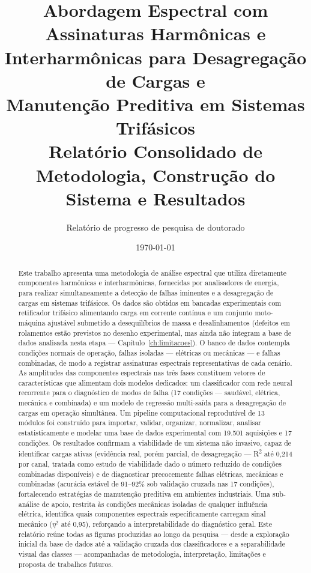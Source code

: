 \documentclass[12pt,a4paper]{report}
\title{\textbf{Abordagem Espectral com Assinaturas Harmônicas e\\
Interharmônicas para Desagregação de Cargas e\\
Manutenção Preditiva em Sistemas Trifásicos}\\[0.4cm]
\large Relatório Consolidado de Metodologia, Construção do Sistema e Resultados}
\author{Relatório de progresso de pesquisa de doutorado}
\date{\today}
\begin{document}
\maketitle

\begin{abstract}
\noindent
Este trabalho apresenta uma metodologia de análise espectral que utiliza
diretamente componentes harmônicas e interharmônicas, fornecidas por
analisadores de energia, para realizar simultaneamente a detecção de falhas
iminentes e a desagregação de cargas em sistemas trifásicos. Os dados são
obtidos em bancadas experimentais com retificador trifásico alimentando carga
em corrente contínua e um conjunto moto-máquina ajustável submetido a
desequilíbrios de massa e desalinhamentos (defeitos em rolamentos estão
previstos no desenho experimental, mas ainda não integram a base de dados
analisada nesta etapa — Capítulo~\ref{ch:limitacoes}). O banco de dados
contempla condições normais de operação, falhas isoladas — elétricas ou
mecânicas — e falhas combinadas, de modo a registrar assinaturas espectrais
representativas de cada cenário. As amplitudes das componentes espectrais nas
três fases constituem vetores de características que alimentam dois modelos
dedicados: um classificador com rede neural recorrente para o diagnóstico de
modos de falha (17 condições — saudável, elétrica, mecânica e combinada) e um
modelo de regressão multi-saída para a desagregação de cargas em operação
simultânea. Um pipeline computacional reprodutível de 13 módulos foi
construído para importar, validar, organizar, normalizar, analisar
estatisticamente e modelar uma base de dados experimental com 19.501
aquisições e 17 condições. Os resultados confirmam a viabilidade de um
sistema não invasivo, capaz de identificar cargas ativas (evidência real,
porém parcial, de desagregação — R\textsuperscript{2} até 0,214 por canal,
tratada como estudo de viabilidade dado o número reduzido de condições
combinadas disponíveis) e de diagnosticar precocemente falhas elétricas,
mecânicas e combinadas (acurácia estável de 91--92\% sob validação cruzada
nas 17 condições), fortalecendo estratégias de manutenção preditiva em
ambientes industriais. Uma sub-análise de apoio, restrita às condições
mecânicas isoladas de qualquer influência elétrica, identifica quais
componentes espectrais especificamente carregam sinal mecânico
($\eta^2$ até 0,95), reforçando a interpretabilidade do diagnóstico geral.
Este relatório reúne todas as figuras produzidas ao longo da pesquisa — desde
a exploração inicial da base de dados até a validação cruzada dos
classificadores e a separabilidade visual das classes — acompanhadas de
metodologia, interpretação, limitações e proposta de trabalhos futuros.
\end{abstract}
\end{document}
